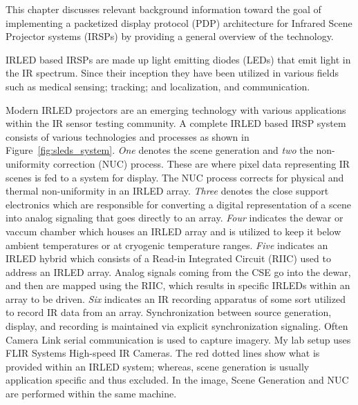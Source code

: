 \label{chap:background}

This chapter discusses relevant background information toward the goal of implementing a packetized display protocol (PDP) architecture for Infrared Scene Projector systems (IRSPs) by providing a general overview of the technology.

IRLED based IRSPs are made up light emitting diodes (LEDs) that emit light in the IR spectrum\cite{BiardGary1966}. Since their inception they have been utilized in various fields such as medical sensing\cite{YamanishiHamaguri1995,MeeksEtAl1998,Sadick2009,MonteiroEtAl2011,TakhtfooladiEtAl2015}; tracking; and localization\cite{Kimon2001,ZeylikovichEtAl2003,PlotogVladescu2015,ScholzEtAl2015,WalshDaemsSteckel2015}, and communication\cite{GeorgopoulosKormakopoulos1986,EscobosaEtAl2004,SohnEtAl2007,JangEtAl2012,CossuEtAl2014}.

Modern IRLED projectors are an emerging technology\cite{AhmedEtAl2018, NabhaEtAl2018, HernandezEtAl2018, HernandezEtAl2019_2, DeputyEtAl2019} with various applications within the IR sensor testing community. A complete IRLED based IRSP system consists of various technologies and processes as shown in Figure~\ref{fig:sleds_system}\cite{HouserEtAl2018_2}. \emph{One} denotes the scene generation and \emph{two} the non-uniformity correction (NUC) process. These are where pixel data representing IR scenes is fed to a system for display. The NUC process corrects for physical and thermal non-uniformity\cite{BarakhshanEtAl2017} in an IRLED array\cite{BarakhshanEtAl2018}. \emph{Three} denotes the close support electronics\cite{EjzakEtAl2015} which are responsible for converting a digital representation of a scene into analog signaling that goes directly to an array. \emph{Four} indicates the dewar\cite{LangeEtAl2011, MarksEtAl2017} or vaccum chamber which houses an IRLED array and is utilized to keep it below ambient temperatures or at cryogenic temperature ranges. \emph{Five} indicates an IRLED hybrid which consists of a Read-in Integrated Circuit (RIIC)\cite{HernandezEtAl2017} used to address an IRLED array. Analog signals coming from the CSE go into the dewar, and then are mapped using the RIIC, which results in specific IRLEDs within an array to be driven. \emph{Six} indicates an IR recording apparatus of some sort utilized to record IR data from an array. Synchronization between source generation, display, and recording is maintained via explicit synchronization signaling. Often Camera Link serial communication\cite{BaslerEtAl2000, ZhuEtAl2008} is used to capture imagery. My lab setup uses FLIR Systems High-speed IR Cameras\cite{FLIR2014_1, FLIR2014_1, FLIR2016}. The red dotted lines show what is provided within an IRLED system; whereas, scene generation is usually application specific and thus excluded. In the image, Scene Generation and NUC are performed within the same machine.

